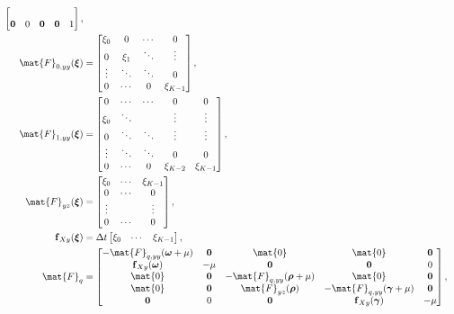 \documentclass{jpmarticle}
\renewcommand{\vec}[1]{\boldsymbol{\mathrm{#1}}}
\let\subequationsorig\subequations%
\let\endsubequationsorig\endsubequations%
\renewenvironment{subequations}{
  \subequationsorig
  \renewcommand{\theequation}{\theparentequation.\arabic{equation}}
}{
  \endsubequationsorig
}
\begin{document}
\begin{subequations}
\begin{align}
\begin{bmatrix}
      \\
      \vec{0} & 0 & \vec{0} & \vec{0} & 1
    \end{bmatrix},
    \\
    \mat{F}_{0, yy}(\vec{\xi}) &=
    \begin{bmatrix}
      \xi_0 & 0 & \cdots & 0 \\
      0 & \xi_1 & \ddots & \vdots \\
      \vdots & \ddots & \ddots & 0 \\
      0 & \cdots & 0 & \xi_{K - 1}
    \end{bmatrix},
    \\
    \mat{F}_{1, yy}(\vec{\xi}) &=
    \begin{bmatrix}
      0 & \cdots & \cdots & 0 & 0 \\
      \xi_0 & \ddots & & \vdots & \vdots \\
      0 & \ddots & \ddots & \vdots & \vdots \\
      \vdots & \ddots & \ddots & 0 & 0 \\
      0 & \cdots & 0 & \xi_{K - 2} & \xi_{K - 1}
    \end{bmatrix},
    \\
    \mat{F}_{yz}(\vec{\xi}) &=
    \begin{bmatrix}
      \xi_0 & \cdots & \xi_{K - 1} \\
      0 & \cdots & 0 \\
      \vdots & & \vdots \\
      0 & \cdots & 0
    \end{bmatrix},
    \\
    \vec{f}_{Xy}(\vec{\xi}) &=
    \Delta t
    \begin{bmatrix}
      \xi_0 & \cdots & \xi_{K - 1}
    \end{bmatrix},
    \\
    \mat{F}_q &=
    \begin{bmatrix}
      - \mat{F}_{q, yy}(\vec{\omega} + \mu) & \vec{0} & \mat{0} & \mat{0}
      & \vec{0}
      \\
      \vec{f}_{Xy}(\vec{\omega}) & - \mu & \vec{0} & \vec{0} & 0
      \\
      \mat{0} & \vec{0} & - \mat{F}_{q, yy}(\vec{\rho} + \mu) & \mat{0}
      & \vec{0}
      \\
      \mat{0} & \vec{0} & \mat{F}_{yz}(\vec{\rho})
      & - \mat{F}_{q, yy}(\vec{\gamma} + \mu) & \vec{0}
      \\
      \vec{0} & 0 & \vec{0} & \vec{f}_{Xy}(\vec{\gamma}) & - \mu
    \end{bmatrix},

\end{align}
\end{subequations}
\end{document}
